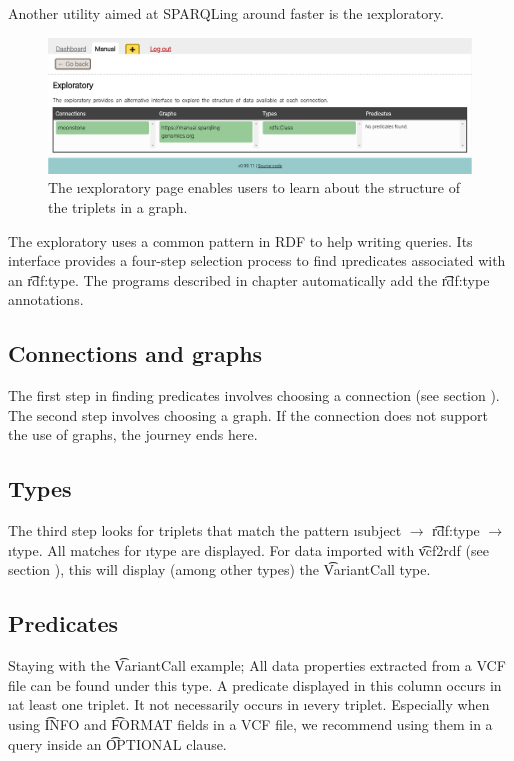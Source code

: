   Another utility aimed at SPARQLing around faster is the \i{exploratory}.

  \begin{figure}[H]
    \begin{center}
      \includegraphics[width=1.0\textwidth]{figures/sg-web-exploratory.pdf}
    \end{center}
    \caption{The \i{exploratory} page enables users to learn about the
      structure of the triplets in a graph.}
    \label{fig:web-exploratory}
  \end{figure}

  The exploratory uses a common pattern in RDF to help writing queries.  Its
  interface provides a four-step selection process to find \i{predicates}
  associated with an \t{rdf:type}.  The programs described in chapter
   automatically add the \t{rdf:type} annotations.

\subsection{Connections and graphs}

  The first step in finding predicates involves choosing a connection
  (see section ).  The second step involves
  choosing a graph.  If the connection does not support the use of graphs,
  the journey ends here.

\subsection{Types}

  The third step looks for triplets that match the pattern \i{subject}
  $\rightarrow$ \t{rdf:type} $\rightarrow$ \i{type}.  All matches for
  \i{type} are displayed.  For data imported with \t{vcf2rdf} (see
  section ), this will display (among other types) the
  \t{VariantCall} type.

\subsection{Predicates}

  Staying with the \t{VariantCall} example;  All data properties extracted
  from a VCF file can be found under this type.  A predicate displayed in this
  column occurs in \i{at least} one triplet.  It not necessarily occurs in
  \i{every} triplet.  Especially when using \t{INFO} and \t{FORMAT}
  fields in a VCF file, we recommend using them in a query inside an
  \t{OPTIONAL} clause.

\pagebreak{}


\pagebreak{}

